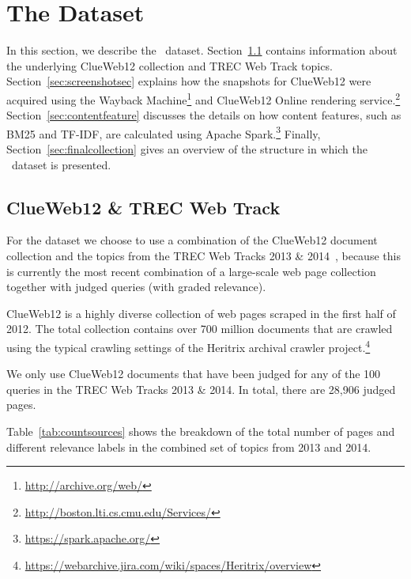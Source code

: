 
\section{The \protect\datasetname{} Data\-set}
In this section, we describe the \datasetname~data\-set. 
Section~\ref{sec:trecclue} contains information about the underlying ClueWeb12 collection and TREC Web Track topics. Section~\ref{sec:screenshotsec} explains how the snapshots for ClueWeb12 were acquired using the Wayback Machine\footnote{\url{http://archive.org/web/}} and ClueWeb12 Online rendering service.\footnote{\url{http://boston.lti.cs.cmu.edu/Services/}} Section~\ref{sec:contentfeature} discusses the details on how content features, such as BM25 and TF-IDF, are calculated using Apache Spark.\footnote{\url{https://spark.apache.org/}} Finally, Section~\ref{sec:finalcollection} gives an overview of the structure in which the \datasetname~dataset is presented.

\subsection{ClueWeb12 \& TREC Web Track}\label{sec:trecclue}
For the \datasetname{} dataset we choose to use a combination of the ClueWeb12 document collection and the topics from the TREC Web Tracks 2013 \& 2014~\cite{collins2013trec,collins2015trec},
because this is currently the most recent combination of a large-scale web page collection together with judged queries (with graded relevance). 

ClueWeb12 is a highly diverse collection of web pages scraped in the first half of 2012.
The total collection contains over 700 million documents that are crawled using the typical crawling settings of the Heritrix archival crawler project.\footnote{\url{https://webarchive.jira.com/wiki/spaces/Heritrix/overview}}

We only use ClueWeb12 documents that have been judged for any of the 100 queries in the TREC Web Tracks 2013 \& 2014. In total, there are 28,906 judged pages.

Table~\ref{tab:countsources} shows the breakdown of the total number of pages and different relevance labels in the combined set of topics from 2013 and 2014.

